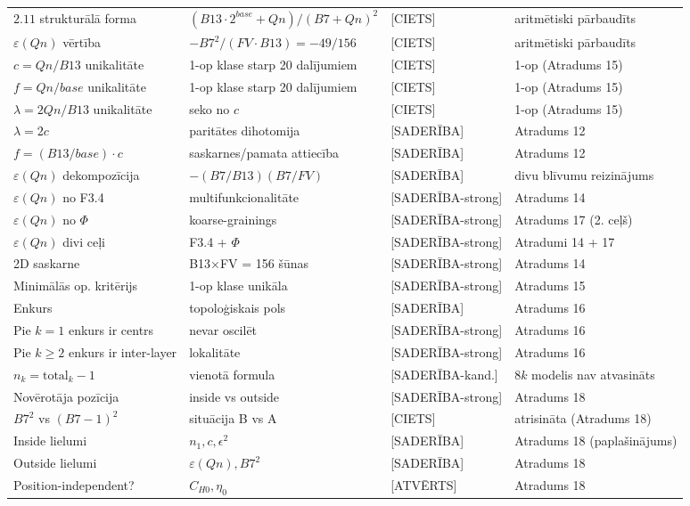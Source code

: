 \documentclass[12pt,a4paper]{article}
\begin{document}
\begin{longtable}{|l|l|l|l|}
$2.11$ strukturālā forma & $(B13\cdot 2^{base}+Qn)/(B7+Qn)^2$ & [CIETS] & aritmētiski pārbaudīts \\
$\varepsilon(Qn)$ vērtība & $-B7^2/(FV\cdot B13) = -49/156$ & [CIETS] & aritmētiski pārbaudīts \\
\hline
$c = Qn/B13$ unikalitāte & 1-op klase starp 20 dalījumiem & [CIETS] & 1-op (Atradums 15) \\
$f = Qn/base$ unikalitāte & 1-op klase starp 20 dalījumiem & [CIETS] & 1-op (Atradums 15) \\
$\lambda = 2Qn/B13$ unikalitāte & seko no $c$ & [CIETS] & 1-op (Atradums 15) \\
$\lambda = 2c$ & paritātes dihotomija & [SADERĪBA] & Atradums 12 \\
$f = (B13/base)\cdot c$ & saskarnes/pamata attiecība & [SADERĪBA] & Atradums 12 \\
$\varepsilon(Qn)$ dekompozīcija & $-(B7/B13)(B7/FV)$ & [SADERĪBA] & divu blīvumu reizinājums \\
\hline
$\varepsilon(Qn)$ no F3.4 & multifunkcionalitāte & [SADERĪBA-strong] & Atradums 14 \\
$\varepsilon(Qn)$ no $\Phi$ & koarse-grainings & [SADERĪBA-strong] & Atradums 17 (2. ceļš) \\
$\varepsilon(Qn)$ divi ceļi & F3.4 + $\Phi$ & [SADERĪBA-strong] & Atradumi 14 + 17 \\
2D saskarne & B13×FV = 156 šūnas & [SADERĪBA-strong] & Atradums 14 \\
Minimālās op. kritērijs & 1-op klase unikāla & [SADERĪBA-strong] & Atradums 15 \\
Enkurs & topoloģiskais pols & [SADERĪBA] & Atradums 16 \\
Pie $k=1$ enkurs ir centrs & nevar oscilēt & [SADERĪBA-strong] & Atradums 16 \\
Pie $k\geq 2$ enkurs ir inter-layer & lokalitāte & [SADERĪBA-strong] & Atradums 16 \\
$n_k = \text{total}_k - 1$ & vienotā formula & [SADERĪBA-kand.] & $8k$ modelis nav atvasināts \\
\hline
Novērotāja pozīcija & inside vs outside & [SADERĪBA-strong] & Atradums 18 \\
$B7^2$ vs $(B7-1)^2$ & situācija B vs A & [CIETS] & atrisināta (Atradums 18) \\
Inside lielumi & $n_1, c, \epsilon^2$ & [SADERĪBA] & Atradums 18 (paplašinājums) \\
Outside lielumi & $\varepsilon(Qn), B7^2$ & [SADERĪBA] & Atradums 18 \\
Position-independent? & $C_{H0}, \eta_0$ & [ATVĒRTS] & Atradums 18 \\
\hline
\end{longtable}
\end{document}
